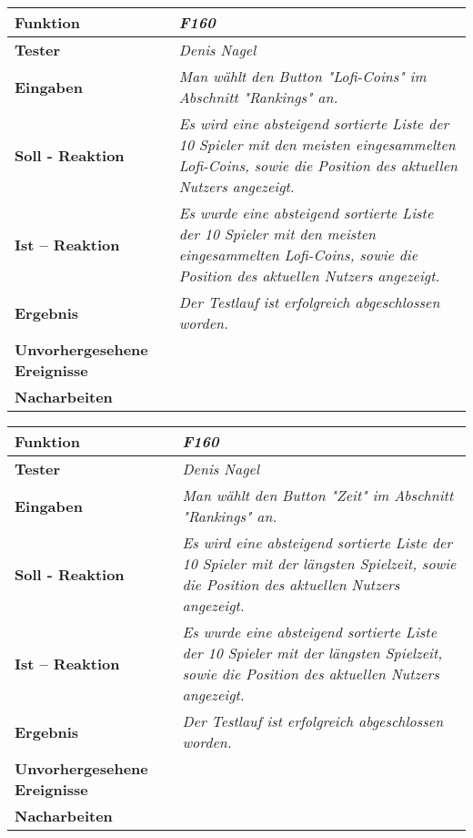\newpage
\begin{longtable}{|p{4cm}|p{11cm}|}
\hline
\textbf{Funktion} & \textit{\textbf{F160}} \\
\hline
\textbf{Tester} & \textit{Denis Nagel} \\
\hline
\textbf{Eingaben} & \textit{Man wählt den Button "Lofi-Coins" im Abschnitt "Rankings" an.} \\
\hline
\textbf{Soll - Reaktion} & \textit{Es wird eine absteigend sortierte Liste der 10 Spieler mit den meisten eingesammelten Lofi-Coins, sowie die Position des aktuellen Nutzers angezeigt.} \\
\hline
\textbf{Ist -- Reaktion} & \textit{Es wurde eine absteigend sortierte Liste der 10 Spieler mit den meisten eingesammelten Lofi-Coins, sowie die Position des aktuellen Nutzers angezeigt.} \\
\hline
\textbf{Ergebnis} & \textit{Der Testlauf ist erfolgreich abgeschlossen worden.} \\
\hline
\textbf{Unvorhergesehene Ereignisse} &
\textit{} \\
\hline
\textbf{Nacharbeiten } & \textit{} \\
\hline
\end{longtable}

\newpage
\begin{longtable}{|p{4cm}|p{11cm}|}
\hline
\textbf{Funktion} & \textit{\textbf{F160}} \\
\hline
\textbf{Tester} & \textit{Denis Nagel} \\
\hline
\textbf{Eingaben} & \textit{Man wählt den Button "Zeit" im Abschnitt "Rankings" an.} \\
\hline
\textbf{Soll - Reaktion} & \textit{Es wird eine absteigend sortierte Liste der 10 Spieler mit der längsten Spielzeit, sowie die Position des aktuellen Nutzers angezeigt.} \\
\hline
\textbf{Ist -- Reaktion} & \textit{Es wurde eine absteigend sortierte Liste der 10 Spieler mit der längsten Spielzeit, sowie die Position des aktuellen Nutzers angezeigt.} \\
\hline
\textbf{Ergebnis} & \textit{Der Testlauf ist erfolgreich abgeschlossen worden.} \\
\hline
\textbf{Unvorhergesehene Ereignisse} &
\textit{} \\
\hline
\textbf{Nacharbeiten } & \textit{} \\
\hline
\end{longtable}

